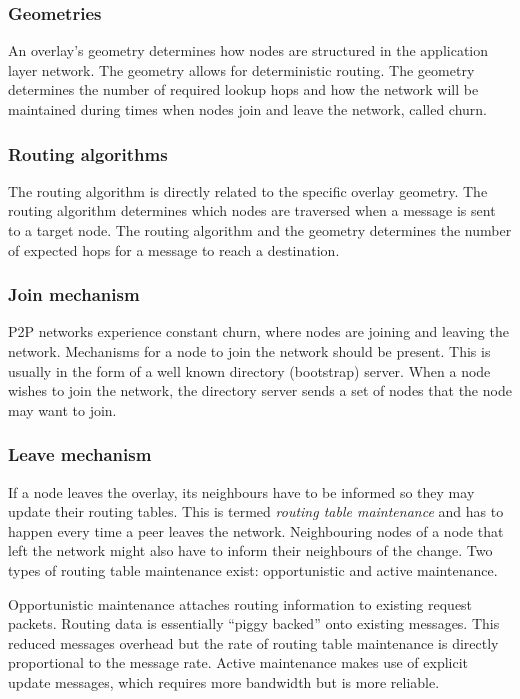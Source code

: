 \subsubsection{Geometries}

An overlay's geometry determines how nodes are structured in the application layer network. The geometry allows for deterministic routing. The geometry determines the number of required lookup hops and how the network will be maintained during times when nodes join and leave the network, called churn.

\subsubsection{Routing algorithms}

The routing algorithm is directly related to the specific overlay geometry. The routing algorithm determines which nodes are traversed when a message is sent to a target node. The routing algorithm and the geometry determines the number of expected hops for a message to reach a destination.

\subsubsection{Join mechanism}

P2P networks experience constant churn, where nodes are joining and leaving the network. Mechanisms for a node to join the network should be present. This is usually in the form of a well known directory (bootstrap) server. When a node wishes to join the network, the directory server sends a set of nodes that the node may want to join.

\subsubsection{Leave mechanism}

If a node leaves the overlay, its neighbours have to be informed so they may update their routing tables. This is termed \emph{routing table maintenance} and has to happen every time a peer leaves the network. Neighbouring nodes of a node that left the network might also have to inform their neighbours of the change. Two types of routing table maintenance exist: opportunistic and active maintenance.

Opportunistic maintenance attaches routing information to existing request packets. Routing data is essentially ``piggy backed'' onto existing messages. This reduced messages overhead but the rate of routing table maintenance is directly proportional to the message rate. Active maintenance makes use of explicit update messages, which requires more bandwidth but is more reliable.


